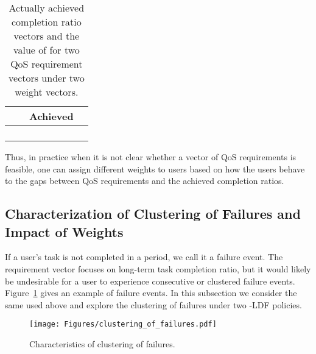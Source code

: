 \documentclass[prodmode,acmtompecs]{acmsmall}
\newcommand{\myComments}[1]{}
\newcommand{\commentEnd}{\myComments{End}}
\begin{document}
\begin{table}[h]
\normalsize
    \centering
	\begin{tabular}{|c|c|c|c|}
	 \hline
	  &  & Achieved  & 	\\
	 \hline
	 \multirow{4}{*}{} &
	 \multirow{2}{*}{} & \multirow{2}{*}{} & \multirow{2}{*}{}	\\
	 Feasible: &  &  &	\\
	 \cline{2-4}
	  & \multirow{2}{*}{} & \multirow{2}{*}{} & \multirow{2}{*}{}	\\
	  &  &  &	\\
	 \hline
	 \multirow{4}{*}{} &
	 \multirow{2}{*}{} & \multirow{2}{*}{} & \multirow{2}{*}{}	\\
	 Infeasible: &  &  &	\\
	 \cline{2-4}
	  & \multirow{2}{*}{} & \multirow{2}{*}{} & \multirow{2}{*}{}	\\
	  &  &  &	\\
	 \hline
	\end{tabular}
    \caption{Actually achieved completion ratio vectors and the value of  for two QoS requirement vectors under two weight vectors. }
    \label{tab_q_and_q_prime}
\end{table}



Thus, in practice when it is not clear whether a vector of QoS requirements is feasible, one can assign different weights to users based on how the users behave to the gaps between QoS requirements and the achieved completion ratios. 

\commentEnd\fi

\subsection{Characterization of Clustering of Failures and Impact of Weights}
\label{subsection_characterization_of_failure_clustering}
If a user's task is not completed in a period, we call it a failure event. The requirement vector  focuses on long-term task completion ratio, but it would likely be undesirable for a user to experience consecutive or clustered failure events. 
Figure~\ref{figure_clustering_of_failures} gives an example of failure events. 
In this subsection we consider the same  used above and explore the clustering of failures under two -LDF policies. 

\begin{figure}[htp]
  \centering
  \texttt{[image: Figures/clustering\_of\_failures.pdf]}
  \caption{Characteristics of clustering of failures. }
  \label{figure_clustering_of_failures}
\end{figure}
\end{document}
